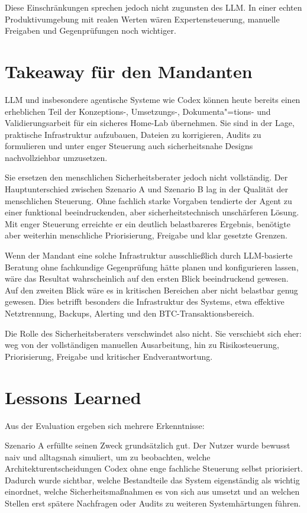 Diese Einschränkungen sprechen jedoch nicht zugunsten des \ac{LLM}. In einer echten Produktivumgebung mit realen Werten wären Expertensteuerung, manuelle Freigaben und Gegenprüfungen noch wichtiger.

\section{Takeaway für den Mandanten}

\acs{LLM} und insbesondere agentische Systeme wie Codex können heute bereits einen erheblichen Teil der Konzeptions-, Umsetzungs-, Dokumenta"=tions- und Validierungsarbeit für ein sicheres Home-Lab übernehmen. Sie sind in der Lage, praktische Infrastruktur aufzubauen, Dateien zu korrigieren, Audits zu formulieren und unter enger Steuerung auch sicherheitsnahe Designs nachvollziehbar umzusetzen.\cite{openaiCodexDocs,openaiShellTool}

Sie ersetzen den menschlichen Sicherheitsberater jedoch nicht vollständig. Der Hauptunterschied zwischen Szenario A und Szenario B lag in der Qualität der menschlichen Steuerung. Ohne fachlich starke Vorgaben tendierte der Agent zu einer funktional beeindruckenden, aber sicherheitstechnisch unschärferen Lösung. Mit enger Steuerung erreichte er ein deutlich belastbareres Ergebnis, benötigte aber weiterhin menschliche Priorisierung, Freigabe und klar gesetzte Grenzen.

Wenn der Mandant eine solche Infrastruktur ausschließlich durch \ac{LLM}-basierte Beratung ohne fachkundige Gegenprüfung hätte planen und konfigurieren lassen, wäre das Resultat wahrscheinlich auf den ersten Blick beeindruckend gewesen. Auf den zweiten Blick wäre es in kritischen Bereichen aber nicht belastbar genug gewesen. Dies betrifft besonders die Infrastruktur des Systems, etwa effektive Netztrennung, Backups, Alerting und den \ac{BTC}-Transaktionsbereich.

Die Rolle des Sicherheitsberaters verschwindet also nicht. Sie verschiebt sich eher: weg von der vollständigen manuellen Ausarbeitung, hin zu Risikosteuerung, Priorisierung, Freigabe und kritischer Endverantwortung.

\section{Lessons Learned}

Aus der Evaluation ergeben sich mehrere Erkenntnisse:

Szenario A erfüllte seinen Zweck grundsätzlich gut. Der Nutzer wurde bewusst naiv und alltagsnah simuliert, um zu beobachten, welche Architekturentscheidungen Codex ohne enge fachliche Steuerung selbst priorisiert. Dadurch wurde sichtbar, welche Bestandteile das System eigenständig als wichtig einordnet, welche Sicherheitsmaßnahmen es von sich aus umsetzt und an welchen Stellen erst spätere Nachfragen oder Audits zu weiteren Systemhärtungen führen. 

